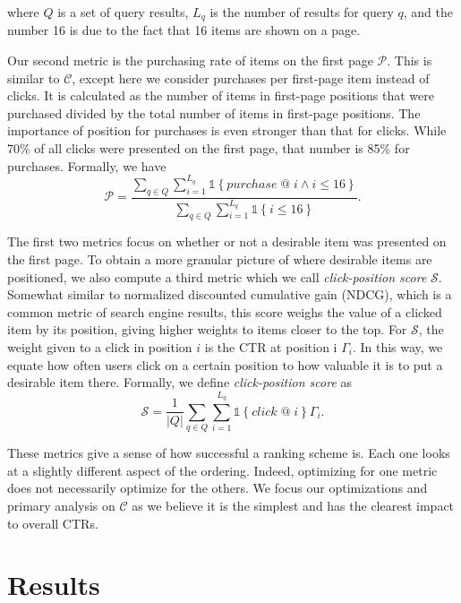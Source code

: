 \documentclass{article}
\begin{document}
where $Q$ is a set of query results, $L_q$ is the number of results for query $q$, and
the number 16 is due to the fact that 16 items are shown on a page.

Our second metric is the purchasing rate of items on the first page $\mathscr{P}$. This is 
similar to $\mathscr{C}$, except here we consider purchases per first-page item 
instead of clicks. It is calculated as the number of items in first-page positions that 
were purchased divided by the total number of items in first-page positions. The 
importance of position for purchases is even stronger than that for clicks. While 70\% of 
all clicks were presented on the first page, that number is 85\% for purchases. Formally,
we have
\begin{equation*}
    \mathscr{P} = \frac{\sum_{q \in Q}\sum_{i=1}^{L_q}\mathds{1}\left\{purchase\; @\; i \wedge i \leq 16\right\}}{\sum_{q \in Q}\sum_{i=1}^{L_q}\mathds{1}\left\{i \leq 16\right\}}.
\end{equation*}

The first two metrics focus on whether or not a desirable item was presented on the 
first page. To obtain a more granular picture of where desirable items are positioned, 
we also compute a third metric which we call {\em click-position score} $\mathscr{S}$. 
Somewhat similar to normalized discounted cumulative gain (NDCG), which is a common metric
of search engine results, this score weighs the value of a clicked item by its position, 
giving higher weights to items closer to the top. For $\mathscr{S}$, the weight given to 
a click in position $i$ is the CTR at position i $\Gamma_i$. In this way, we equate how 
often users click on a certain position to how valuable it is to put a desirable 
item there. Formally, we define {\em click-position score} as
\begin{equation*}
    \mathscr{S} = \frac{1}{\left\vert{Q}\right\vert}\sum_{q \in Q}\sum_{i=1}^{L_q}\mathds{1}\left\{click\; @\; i\right\}\Gamma_i.
\end{equation*}

These metrics give a sense of how successful a ranking scheme is. Each one looks at a slightly 
different aspect of the ordering. Indeed, optimizing for one metric does not necessarily 
optimize for the others. We focus our optimizations and primary analysis on $\mathscr{C}$
as we believe it is the simplest and has the clearest impact to overall CTRs.

\section{Results}
\end{document}
